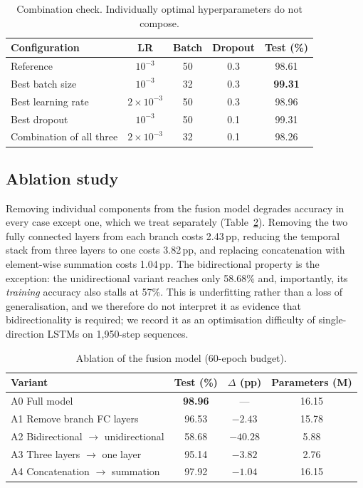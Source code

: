 \documentclass[11pt,a4paper]{article}
\begin{document}
\begin{table}[htbp]\centering
\caption{Combination check. Individually optimal hyperparameters do not compose.}
\label{tab:combo}
\begin{tabular}{lcccc}
\toprule
Configuration & LR & Batch & Dropout & Test (\%) \\
\midrule
Reference & $10^{-3}$ & 50 & 0.3 & 98.61 \\
Best batch size & $10^{-3}$ & 32 & 0.3 & \textbf{99.31} \\
Best learning rate & $2\times10^{-3}$ & 50 & 0.3 & 98.96 \\
Best dropout & $10^{-3}$ & 50 & 0.1 & 99.31 \\
Combination of all three & $2\times10^{-3}$ & 32 & 0.1 & 98.26 \\
\bottomrule
\end{tabular}
\end{table}

\subsection{Ablation study}

Removing individual components from the fusion model degrades accuracy in every case except one, which we treat separately (Table~\ref{tab:ablation}). Removing the two fully connected layers from each branch costs 2.43\,pp, reducing the temporal stack from three layers to one costs 3.82\,pp, and replacing concatenation with element-wise summation costs 1.04\,pp. The bidirectional property is the exception: the unidirectional variant reaches only 58.68\% and, importantly, its \emph{training} accuracy also stalls at 57\%. This is underfitting rather than a loss of generalisation, and we therefore do not interpret it as evidence that bidirectionality is required; we record it as an optimisation difficulty of single-direction LSTMs on 1,950-step sequences.

\begin{table}[htbp]\centering
\caption{Ablation of the fusion model (60-epoch budget).}
\label{tab:ablation}
\begin{tabular}{lccc}
\toprule
Variant & Test (\%) & $\Delta$ (pp) & Parameters (M) \\
\midrule
A0 Full model & \textbf{98.96} & --- & 16.15 \\
A1 Remove branch FC layers & 96.53 & $-2.43$ & 15.78 \\
A2 Bidirectional $\rightarrow$ unidirectional & 58.68 & $-40.28$ & 5.88 \\
A3 Three layers $\rightarrow$ one layer & 95.14 & $-3.82$ & 2.76 \\
A4 Concatenation $\rightarrow$ summation & 97.92 & $-1.04$ & 16.15 \\
\bottomrule
\end{tabular}
\end{table}
\end{document}
